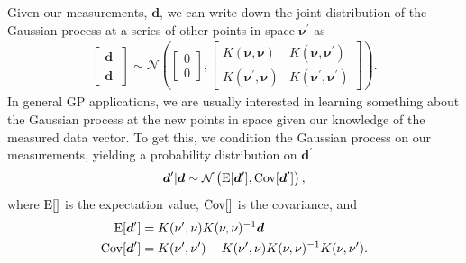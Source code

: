 \documentclass[a4paper,fleqn,usenatbib]{mnras}
\def\d{\boldsymbol{d}}
\def\Cov{{\rm Cov}}
\def\Exp{{\rm E}}
\def\bnu{\boldsymbol{\nu}}
\def\K{\boldsymbol{K}}
\begin{document}
Given our measurements, $\d$, we can write down the joint distribution of the Gaussian process at a series of other points in space $\bnu^\prime$ as
\begin{align}
\label{eq:joint_gp}
\begin{bmatrix}\d \\ \d^\prime\end{bmatrix} \sim \mathcal{N}\left(\begin{bmatrix}0\\ 0\end{bmatrix},
\begin{bmatrix}K(\bnu,\bnu) & K(\bnu,\bnu^\prime)\\K(\bnu^\prime, \bnu) & K(\bnu^\prime,\bnu^\prime)\end{bmatrix}\right).
\end{align}
In general GP applications, we are usually interested in learning something about the Gaussian process at the new points in space given our knowledge of the measured data vector.
To get this, we condition the Gaussian process on our measurements, yielding a probability distribution on $\d^\prime$
\begin{align}
\d^\prime|\d \sim \mathcal{N}\left(\Exp[\d^\prime], \Cov[\d^\prime]\right),
\end{align}
where $\Exp[]$ is the expectation value, $\Cov[]$ is the covariance, and
\begin{align}
\label{eq:gp_conditional}
\Exp[\d^\prime] &= K(\nu^\prime,\nu)K(\nu,\nu)^{-1}\d \\
\Cov[\d^\prime] &= K(\nu^\prime,\nu^\prime) - K(\nu^\prime, \nu)K(\nu, \nu)^{-1}K(\nu, \nu^\prime).
\end{align}
\end{document}
